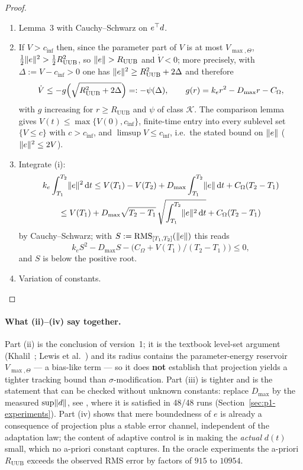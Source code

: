 \begin{proof}
\begin{enumerate}[label=(\roman*)]
\item Lemma~3 with Cauchy--Schwarz on $e^\top d$.
\item If $V>c_{\inf}$ then, since the parameter part of $V$ is at most $V_{\max,\Theta}$,
  $\tfrac12\lVert e\rVert^2>\tfrac12R_{\mathrm{UUB}}^2$, so $\lVert e\rVert>R_{\mathrm{UUB}}$ and $\dot V<0$; more precisely, with
  $\Delta:=V-c_{\inf}>0$ one has $\lVert e\rVert^2\ge R_{\mathrm{UUB}}^2+2\Delta$ and therefore
  \[
  \dot V\le-g\Bigl(\sqrt{R_{\mathrm{UUB}}^2+2\Delta}\Bigr)=:-\psi(\Delta),\qquad g(r)=k_er^2-D_{\max}r-C_\Omega,
  \]
  with $g$ increasing for $r\ge R_{\mathrm{UUB}}$ and $\psi$ of class $\mathcal K$. The comparison lemma gives
  $V(t)\le\max\{V(0),c_{\inf}\}$, finite-time entry into every sublevel set $\{V\le c\}$ with $c>c_{\inf}$, and
  $\limsup V\le c_{\inf}$, i.e.\ the stated bound on $\lVert e\rVert$ ($\lVert e\rVert^2\le2V$).
\item Integrate (i):
  \begin{multline*}
  k_e\int_{T_1}^{T_2}\lVert e\rVert^2\,\mathrm{d} t\le V(T_1)-V(T_2)+D_{\max}\int_{T_1}^{T_2}\lVert e\rVert\,\mathrm{d} t+C_\Omega(T_2-T_1)\\
  \le V(T_1)+D_{\max}\sqrt{T_2-T_1}\,\sqrt{\int_{T_1}^{T_2}\lVert e\rVert^2\,\mathrm{d} t}+C_\Omega(T_2-T_1)
  \end{multline*}
  by Cauchy--Schwarz; with $S:=\operatorname{RMS}_{[T_1,T_2]}(\lVert e\rVert)$ this reads
  \[
  k_eS^2-D_{\max}S-\bigl(C_\Omega+V(T_1)/(T_2-T_1)\bigr)\le0,
  \]
  and $S$ is below the positive root.
\item Variation of constants.\qedhere
\end{enumerate}
\end{proof}

\paragraph{What (ii)--(iv) say together.} Part (ii) is the conclusion of version~1; it is the textbook level-set
argument (Khalil~\cite[Thm.~4.18]{khalil2002}; Lewis et al.~\cite{lewis1999}) and its radius contains the
parameter-energy reservoir $V_{\max,\Theta}$ --- a bias-like term --- so it does \textbf{not} establish that
projection yields a tighter tracking bound than $\sigma$-modification. Part (iii) is tighter and is the statement
that can be checked without unknown constants: replace $D_{\max}$ by the measured $\sup\lVert d\rVert$, see
, where it is satisfied in 48/48 runs (Section~\ref{sec:p1-experiments}).
Part (iv) shows that mere boundedness of $e$ is already a consequence of projection plus a stable error channel,
independent of the adaptation law; the content of adaptive control is in making the \emph{actual} $d(t)$ small, which
no a-priori constant captures. In the oracle experiments the a-priori $R_{\mathrm{UUB}}$ exceeds the observed RMS error
by factors of $915$ to $10954$.

